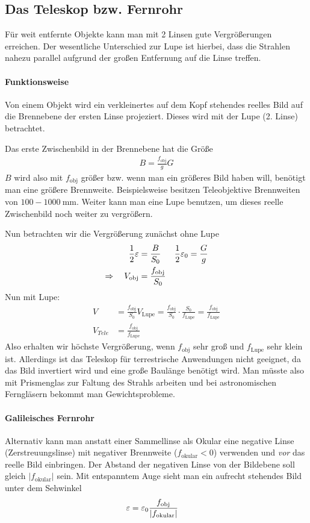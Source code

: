 \subsection{Das Teleskop bzw. Fernrohr}
Für weit entfernte Objekte kann man mit 2 Linsen gute Vergrößerungen
erreichen. Der wesentliche Unterschied zur Lupe ist hierbei, dass die
Strahlen nahezu parallel aufgrund der großen Entfernung auf die Linse
treffen.

\paragraph{Funktionsweise}
Von einem Objekt wird ein verkleinertes auf dem Kopf stehendes reelles
Bild auf die Brennebene der ersten Linse projeziert. Dieses wird mit
der Lupe (2. Linse) betrachtet.

Das erste Zwischenbild in der Brennebene hat die Größe
\begin{align*}
	B = \frac{f_\text{obj}}{g}G
\end{align*}
$B$ wird also mit $f_\text{obj}$ größer bzw. wenn man ein größeres Bild
haben will, benötigt man eine größere Brennweite. Beispielsweise
besitzen Teleobjektive Brennweiten von
$\num{100}-\SI{1000}{\milli\meter}$.
Weiter kann man eine Lupe benutzen, um dieses reelle Zwischenbild noch
weiter zu vergrößern.

Nun betrachten wir die Vergrößerung zunächst ohne Lupe
\begin{align*}
  \frac{1}{2}\varepsilon &= \frac{B}{S_0} 
  &\frac{1}{2}\varepsilon_0 &=\frac{G}{g}\\
  \Rightarrow\quad V_\text{obj} &=\frac{f_\text{obj}}{S_0}
\end{align*}
Nun mit Lupe:
\begin{align*}
  V &= \frac{f_\text{obj}}{S_0}V_\text{Lupe}
      =\frac{f_\text{obj}}{S_0} \cdot \frac{S_0}{f_\text{Lupe}}
      =\frac{f_\text{obj}}{f_\text{Lupe}}\\
  V_{Tele} &=\frac{f_\text{obj}}{f_\text{Lupe}}
\end{align*}
Also erhalten wir höchste Vergrößerung, wenn $f_\text{obj}$ sehr groß und
$f_\text{Lupe}$ sehr klein ist. Allerdings ist das Teleskop für
terrestrische Anwendungen nicht geeignet, da das Bild invertiert wird
und eine große Baulänge benötigt wird. Man müsste also mit Prismenglas
zur Faltung des Strahls arbeiten und bei astronomischen Ferngläsern
bekommt man Gewichtsprobleme. 

\paragraph{Galileisches Fernrohr}
Alternativ kann man anstatt einer Sammellinse als Okular eine negative
Linse (Zerstreuungslinse) mit negativer Brennweite ($f_\text{okular}<0$)
verwenden und \emph{vor} das reelle Bild einbringen. Der Abstand der
negativen Linse von der Bildebene soll gleich $\vert f_\text{okular}\vert$
sein.
Mit entspanntem Auge sieht man ein aufrecht stehendes Bild unter dem
Sehwinkel
\begin{align*}
	\varepsilon &= \varepsilon_0\frac{f_\text{obj}}{\vert f_\text{okular}\vert}
\end{align*}

